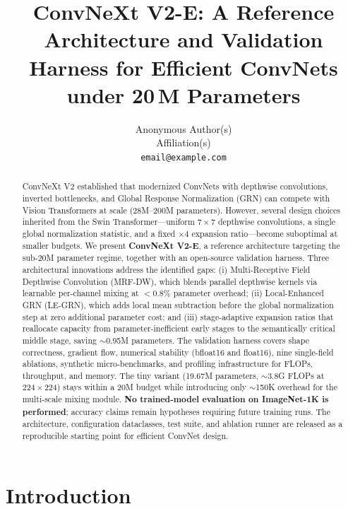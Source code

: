 \documentclass{article}
\title{ConvNeXt V2-E: A Reference Architecture and Validation Harness
       for Efficient ConvNets under 20\,M Parameters}
\author{%
  Anonymous Author(s) \\
  Affiliation(s) \\
  \texttt{email@example.com} \\
  \hspace*{\fill}
}
\begin{document}
\maketitle

\begin{abstract}
ConvNeXt V2 established that modernized ConvNets with depthwise convolutions,
inverted bottlenecks, and Global Response Normalization (GRN) can compete with
Vision Transformers at scale (28M--200M parameters).  However, several design
choices inherited from the Swin Transformer---uniform $7\times7$ depthwise
convolutions, a single global normalization statistic, and a fixed $\times4$
expansion ratio---become suboptimal at smaller budgets.  We present
\textbf{ConvNeXt V2-E}, a reference architecture targeting the sub-20M
parameter regime, together with an open-source validation harness.
Three architectural innovations address the identified gaps: (i)
Multi-Receptive Field Depthwise Convolution (MRF-DW), which blends
parallel depthwise kernels via learnable per-channel mixing at
$<0.8\%$ parameter overhead; (ii) Local-Enhanced GRN (LE-GRN), which
adds local mean subtraction before the global normalization step at
zero additional parameter cost; and (iii) stage-adaptive expansion
ratios that reallocate capacity from parameter-inefficient early stages
to the semantically critical middle stage, saving $\sim$0.95M parameters.
The validation harness covers shape correctness, gradient flow,
numerical stability (bfloat16 and float16), nine single-field ablations,
synthetic micro-benchmarks, and profiling infrastructure for FLOPs,
throughput, and memory.  The tiny variant (19.67M parameters,
$\sim$3.8G FLOPs at $224\times224$) stays within a 20M budget while
introducing only $\sim$150K overhead for the multi-scale mixing module.
\textbf{No trained-model evaluation on ImageNet-1K is performed};
accuracy claims remain hypotheses requiring future training runs.
The architecture, configuration dataclasses, test suite, and ablation
runner are released as a reproducible starting point for efficient
ConvNet design.%
\end{abstract}

\section{Introduction}
\label{sec:introduction}
\end{document}
